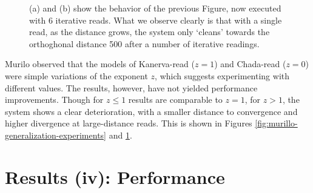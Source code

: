 \begin{figure}[h!]
  \centering


  \caption{(a) and (b) show the behavior of the previous Figure, now executed with 6 iterative reads. What we observe clearly is that with a single read, as the distance grows, the system only `cleans' towards the orthoghonal distance 500 after a number of iterative readings.}
  \label{fig:murillo-generalization-experiments-6reads}
\end{figure}


Murilo observed that the models of Kanerva-read ($z=1$) and Chada-read ($z=0$) were simple variations of the exponent $z$, which suggests experimenting with different values. The results, however, have not yielded performance improvements.  Though for $z \leq 1$ results are comparable to $z=1$, for $z>1$, the system shows a clear deterioration, with a smaller distance to convergence and higher divergence at large-distance reads. This is shown in Figures \ref{fig:murillo-generalization-experiments} and \ref{fig:murillo-generalization-experiments-6reads}.


\chapter{Results (iv): Performance}

